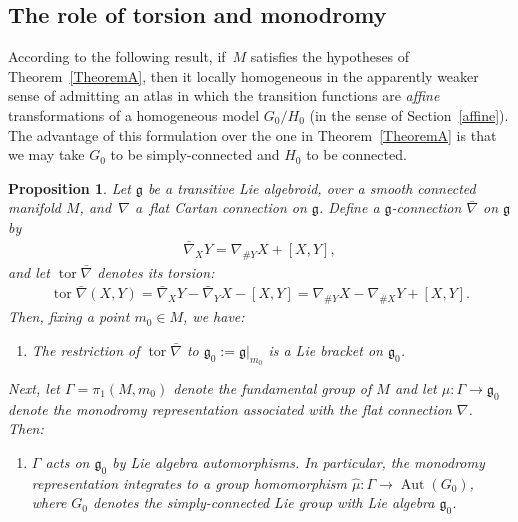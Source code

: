\documentclass[11pt]{article}
\DeclareMathOperator{\automorphism}{Aut}
\DeclareMathOperator{\torsion}{tor}
\numberwithin{equation}{section}
\newtheorem{PropositionBlaom}[TheoremBlaom]{Proposition}
 { \theoremstyle{definition}
\newtheorem{CounterexampleBlaom}[TheoremBlaom]{Counterexample}
\newtheorem{RemarkBlaom}[TheoremBlaom]{Remark} }
\begin{document}
\subsection{The role of torsion and monodromy}\label{rolltorsion}
According to the following result, if~$M$ satisf\/ies the hypotheses of
Theorem~\ref{TheoremA}, then it locally homogeneous in the apparently weaker sense
of admitting an atlas in which the transition functions are {\em
  affine} transformations of a homogeneous model $G_0/H_0$ (in the
sense of Section~\ref{affine}). The advantage of this formulation over the one
in Theorem~\ref{TheoremA} is that we may take $G_0$ to be simply-connected and
$H_0$ to be connected.

\begin{PropositionBlaom}\label{Proposition5.1}
  Let $\mathfrak g$ be a transitive Lie algebroid, over a smooth
  connected manifold $M$, and~$\nabla $ a~flat Cartan connection on
  $\mathfrak g$. Define a ${\mathfrak g}$-connection $\bar\nabla$ on
  $\mathfrak g$ by
  \begin{gather*}
    \bar\nabla_XY=\nabla_{\#Y}X+[X,Y],
  \end{gather*}
  and let $\torsion \bar\nabla $ denotes its torsion:
  \begin{gather*}
    \torsion \bar\nabla (X,Y)=\bar\nabla_XY-\bar\nabla_YX-[X,Y]=\nabla_{\#Y}X-\nabla_{\#X}Y+[X,Y].
  \end{gather*}
  Then, fixing a point $m_0 \in M$, we have:
  \begin{enumerate}\itemsep=0pt
  \item[$(1)$]  %
  The restriction of $\torsion \bar\nabla$ to ${\mathfrak
      g}_0:={\mathfrak g}|_{m_0}$ is a Lie bracket on ${\mathfrak
      g}_0$.
  \end{enumerate}

  Next, let $\Gamma=\pi_1(M,m_0)$ denote the fundamental group of $M$
  and let $\mu \colon \Gamma \rightarrow {\mathfrak g}_0$ denote the
  monodromy representation associated with the flat connection
  $\nabla$. Then:
  \begin{enumerate}\itemsep=0pt
  \item[$(2)$] %
  $\Gamma$ acts on ${\mathfrak g}_0$ by Lie algebra
    automorphisms. In particular, the monodromy representation
    integrates to a group homomorphism $\hat\mu \colon \Gamma
    \rightarrow \automorphism(G_0)$, where $G_0$ denotes the
    simply-connected Lie group with Lie algebra ${\mathfrak g}_0 $.
  \end{enumerate}


\end{PropositionBlaom}
\end{document}
